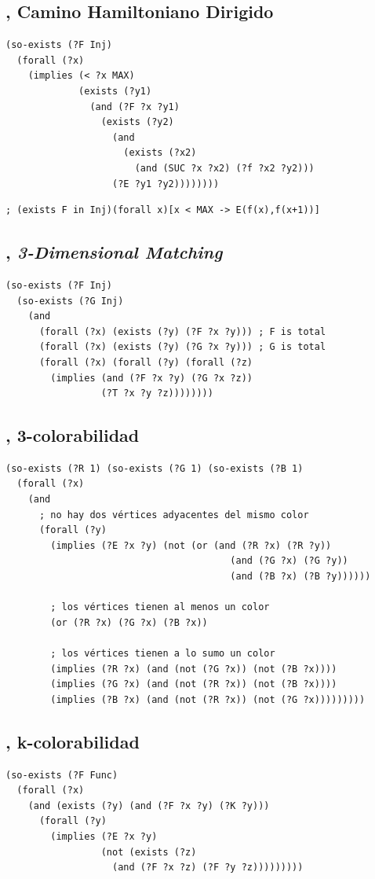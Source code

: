 \subsection{\CHD, Camino Hamiltoniano Dirigido}
\begin{verbatim}
(so-exists (?F Inj)
  (forall (?x)
    (implies (< ?x MAX)
             (exists (?y1)
               (and (?F ?x ?y1)
                 (exists (?y2)
                   (and
                     (exists (?x2) 
                       (and (SUC ?x ?x2) (?f ?x2 ?y2)))
                   (?E ?y1 ?y2))))))))
\end{verbatim}
\begin{verbatim}
; (exists F in Inj)(forall x)[x < MAX -> E(f(x),f(x+1))]
\end{verbatim}

\subsection{\TDM, \textit{3-Dimensional Matching}}
\begin{verbatim}
(so-exists (?F Inj)
  (so-exists (?G Inj)
    (and
      (forall (?x) (exists (?y) (?F ?x ?y))) ; F is total
      (forall (?x) (exists (?y) (?G ?x ?y))) ; G is total
      (forall (?x) (forall (?y) (forall (?z)
        (implies (and (?F ?x ?y) (?G ?x ?z))
                 (?T ?x ?y ?z))))))))
\end{verbatim}

\subsection{\TCOL, 3-colorabilidad}
\begin{verbatim}
(so-exists (?R 1) (so-exists (?G 1) (so-exists (?B 1)
  (forall (?x) 
    (and
      ; no hay dos vértices adyacentes del mismo color
      (forall (?y)
        (implies (?E ?x ?y) (not (or (and (?R ?x) (?R ?y))
                                        (and (?G ?x) (?G ?y))
                                        (and (?B ?x) (?B ?y))))))

        ; los vértices tienen al menos un color
        (or (?R ?x) (?G ?x) (?B ?x))

        ; los vértices tienen a lo sumo un color
        (implies (?R ?x) (and (not (?G ?x)) (not (?B ?x))))
        (implies (?G ?x) (and (not (?R ?x)) (not (?B ?x))))
        (implies (?B ?x) (and (not (?R ?x)) (not (?G ?x)))))))))
\end{verbatim}

\subsection{\KCOL, k-colorabilidad}
\begin{verbatim}
(so-exists (?F Func)
  (forall (?x) 
    (and (exists (?y) (and (?F ?x ?y) (?K ?y)))
      (forall (?y) 
        (implies (?E ?x ?y)
                 (not (exists (?z)
                   (and (?F ?x ?z) (?F ?y ?z)))))))))
\end{verbatim}


